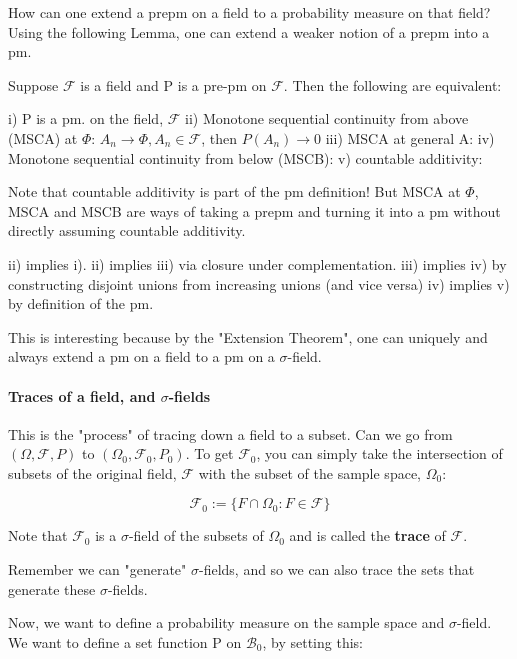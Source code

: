\documentclass{article}
\theoremstyle{proposition}
\begin{document}
			How can one extend a prepm on a field to a probability measure on that field? Using the following Lemma, one can extend a weaker notion of a prepm into a pm.

			\begin{lemma}
			\label{lemma:prepm_on_field}
				Suppose $\mathcal{F}$ is a field and P is a pre-pm on $\mathcal{F}$. Then the following are equivalent:

				i) P is a pm. on the field, $\mathcal{F}$
				ii) Monotone sequential continuity from above (MSCA) at $\Phi$: $A_n \rightarrow \Phi, A_n \in \mathcal{F}$, then $P(A_n) \rightarrow 0$
				iii) MSCA at general A:
				iv) Monotone sequential continuity from below (MSCB):
				v) countable additivity: 

				Note that countable additivity is part of the pm definition! But MSCA at $\Phi$, MSCA and MSCB are ways of taking a prepm and turning it into a pm without directly assuming countable additivity.

				ii) implies i).
				ii) implies iii) via closure under complementation.
				iii) implies iv) by constructing disjoint unions from increasing unions (and vice versa)
				iv) implies v) by definition of the pm.
			\end{lemma}

			This is interesting because by the "Extension Theorem", one can uniquely and always extend a pm on a field to a pm on a $\sigma$-field. 

			\paragraph{Traces of a field, and $\sigma$-fields} This is the "process" of tracing down a field to a subset. Can we go from $(\Omega, \mathcal{F}, P)$ to $(\Omega_0, \mathcal{F}_0, P_0)$. To get $\mathcal{F}_0$, you can simply take the intersection of subsets of the original field, $\mathcal{F}$ with the subset of the sample space, $\Omega_0$:

				$$\mathcal{F}_0 := \{F \cap \Omega_0 : F \in \mathcal{F} \}$$

			Note that $\mathcal{F}_0$ is a $\sigma$-field of the subsets of $\Omega_0$ and is called the \textbf{trace} of $\mathcal{F}$. 

			Remember we can "generate" $\sigma$-fields, and so we can also trace the sets that generate these $\sigma$-fields.

			Now, we want to define a probability measure on the sample space and $\sigma$-field. We want to define a set function P on $\mathcal{B}_0$, by setting this:
\end{document}
